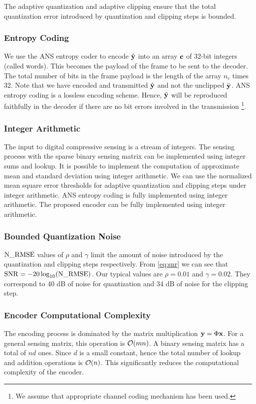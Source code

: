 The adaptive quantization and adaptive clipping ensure that
the total quantization error introduced by quantization and
clipping steps is bounded.

\subsubsection{Entropy Coding}
We use the ANS entropy coder to encode $\hat{\mathbf{y}}$ into an array
$\mathbf{c}$ of 32-bit integers (called words).
This becomes the payload of the frame to be sent to the decoder.
The total number of bits in the frame payload
is the length of the array $n_c$ times 32.
Note that we have encoded and transmitted $\hat{\mathbf{y}}$
and not the unclipped $\bar{\mathbf{y}}$. ANS entropy coding
is a lossless encoding scheme. Hence, $\hat{\mathbf{y}}$
will be reproduced faithfully in the decoder if there
are no bit errors involved in the transmission
\footnote{We assume that appropriate
channel coding mechanism has been used.}.

\subsubsection{Integer Arithmetic}
The input to digital compressive sensing is a stream of integers.
The sensing process with
the sparse binary sensing matrix can be implemented
using integer sums and lookup.
It is possible to implement the computation of
approximate mean and standard deviation
using integer arithmetic.
We can use the normalized mean square error thresholds
for adaptive quantization and clipping steps under integer arithmetic.
ANS entropy coding is fully implemented using integer arithmetic.
The proposed encoder can be fully implemented using integer arithmetic.

\subsubsection{Bounded Quantization Noise}
$\mathrm{N\_RMSE}$ values of $\rho$ and $\gamma$ limit
the amount of noise introduced by the quantization
and clipping steps respectively.
From \eqref{eq:snr} we can see that $\mathrm{SNR} = -20 \log_{10}(\mathrm{N\_RMSE})$.
Our typical values are $\rho=0.01$ and $\gamma=0.02$.
They correspond to 40 dB of noise for quantization
and 34 dB of noise for the clipping step.


\subsubsection{Encoder Computational Complexity}
The encoding process is dominated by the matrix
multiplication $\mathbf{y}  = \Phi \mathbf{x}$. For a general
sensing matrix, this operation is $\mathop{}\mathopen{}\mathcal{O}\mathopen{}\left(m n\right)$.
A binary sensing matrix has a total of $n d$
ones. Since $d$ is a small constant, hence
the total number of lookup and addition operations
is $\mathop{}\mathopen{}\mathcal{O}\mathopen{}\left(n\right)$. This significantly reduces the
computational complexity of the encoder.


